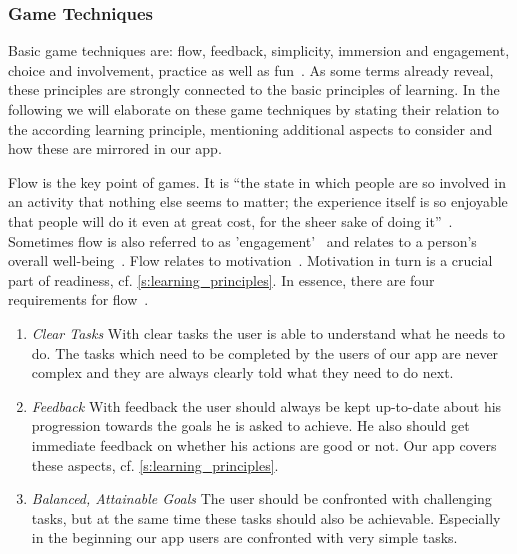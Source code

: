 \subsubsection{Game Techniques}
\label{s:game_techniques}
Basic game techniques are: flow, feedback, simplicity, immersion and engagement, choice and involvement, practice as well as fun~\cite{murphy2011games}.
As some terms already reveal, these principles are strongly connected to the basic principles of learning.
In the following we will elaborate on these game techniques by stating their relation to the according learning principle, mentioning  additional aspects to consider and how these are mirrored in our app.

\begin{description}[leftmargin=0cm]
	\item[Flow] Flow is the key point of games. It is ``the state in which people are so involved in an activity that nothing else seems to matter; the experience itself is so enjoyable that people will do it even at great cost, for the sheer sake of doing it''~\cite{csikszentmihalyi1990flow}.
Sometimes flow is also referred to as 'engagement'~\cite{murphy2011games} and relates to a person's overall well-being~\cite{seligman2012flourish}. 
Flow relates to motivation~\cite{csikszentmihalyi1990flow, csikszentmihalyi1997finding}. Motivation in turn is a crucial part of readiness, cf. \autoref{s:learning_principles}.
In essence, there are four requirements for flow~\cite{csikszentmihalyi1990flow, csikszentmihalyi1997finding, schell2008art}.
	\begin{enumerate}
		\item \textit{Clear Tasks} With clear tasks the user is able to understand what he needs to do. 
The tasks which need to be completed by the users of our app are never complex and they are always clearly told what they need to do next. 
		\item \textit{Feedback} With feedback the user should always be kept up-to-date about his progression towards the goals he is asked to achieve. 
He also should get immediate feedback on whether his actions are good or not. 
Our app covers these aspects, cf. \autoref{s:learning_principles}.
		\item \textit{Balanced, Attainable Goals} The user should be confronted with challenging tasks, but at the same time these tasks should also be achievable. 
Especially in the beginning our app users are confronted with very simple tasks.

\end{enumerate}
\end{description}
